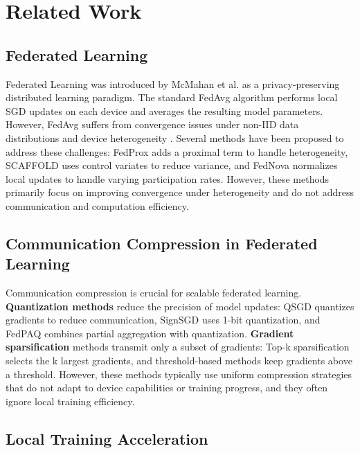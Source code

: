 \documentclass[journal]{IEEEtran}
\begin{document}
\section{Related Work}
\label{sec:related_work}

\subsection{Federated Learning}

Federated Learning was introduced by McMahan et al. \cite{mcmahan2017communication} as a privacy-preserving distributed learning paradigm. The standard FedAvg algorithm performs local SGD updates on each device and averages the resulting model parameters. However, FedAvg suffers from convergence issues under non-IID data distributions and device heterogeneity \cite{li2020federated}. Several methods have been proposed to address these challenges: FedProx \cite{li2020federated} adds a proximal term to handle heterogeneity, SCAFFOLD \cite{karimireddy2020scaffold} uses control variates to reduce variance, and FedNova \cite{wang2020tackling} normalizes local updates to handle varying participation rates. However, these methods primarily focus on improving convergence under heterogeneity and do not address communication and computation efficiency.

\subsection{Communication Compression in Federated Learning}

Communication compression is crucial for scalable federated learning. \textbf{Quantization methods} reduce the precision of model updates: QSGD \cite{alistarh2017qsgd} quantizes gradients to reduce communication, SignSGD \cite{bernstein2018signsgd} uses 1-bit quantization, and FedPAQ \cite{reisizadeh2020fedpaq} combines partial aggregation with quantization. \textbf{Gradient sparsification} methods transmit only a subset of gradients: Top-k sparsification \cite{wangni2018gradient} selects the k largest gradients, and threshold-based methods \cite{stich2018sparsified} keep gradients above a threshold. However, these methods typically use uniform compression strategies that do not adapt to device capabilities or training progress, and they often ignore local training efficiency.

\subsection{Local Training Acceleration}
\end{document}
